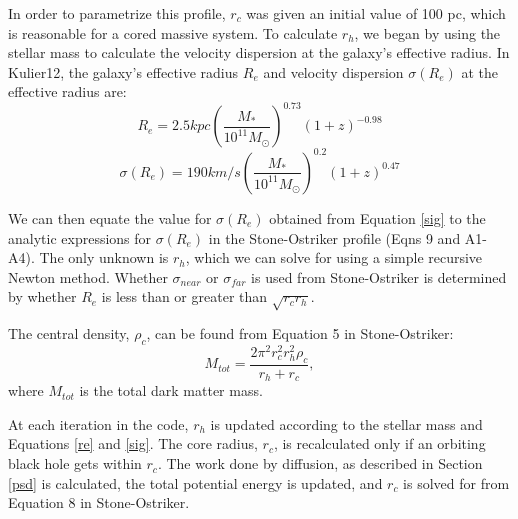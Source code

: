 \documentclass[english, apj]{emulateapj}
\begin{document}
In order to parametrize this profile, $r_c$ was given an initial value of 100 pc, which is reasonable for a cored massive system.  To calculate $r_h$, we began by using the stellar mass to calculate the velocity dispersion at the galaxy's effective radius.  In Kulier12, the galaxy's effective radius $R_{e}$ and velocity dispersion $\sigma(R_e)$ at the effective radius are:
\begin{equation} \label{re}
R_{e} = 2.5 kpc\left(\frac{M_*}{10^{11}M_{\odot}}\right)^{0.73}(1+z)^{-0.98}
\end{equation}
\begin{equation} \label{sig}
\sigma(R_{e}) = 190km/s\left(\frac{M_{*}}{10^{11}M_{\odot}}\right)^{0.2}(1+z)^{0.47}
\end{equation}

We can then equate the value for $\sigma({R_e})$ obtained from Equation \ref{sig} to the analytic expressions for $\sigma(R_{e})$ in the Stone-Ostriker profile (Eqns 9 and A1-A4).  The only unknown is $r_h$, which we can solve for using a simple recursive Newton method.  Whether $\sigma_{near}$ or $\sigma_{far}$ is used from Stone-Ostriker is determined by whether $R_e$ is less than or greater than $\sqrt{r_c r_h}$.

The central density, $\rho_c$, can be found from Equation 5 in Stone-Ostriker:
\begin{equation} \label{rhoc}
M_{tot} = \frac{2\pi^2r_{c}^2r_{h}^2\rho_c}{r_h+r_c},
\end{equation}
where $M_{tot}$ is the total dark matter mass.

At each iteration in the code, $r_h$ is updated according to the stellar mass and Equations \ref{re} and \ref{sig}.  The core radius, $r_c$, is recalculated only if an orbiting black hole gets within $r_c$.  The work done by diffusion, as described in Section \ref{psd} is calculated, the total potential energy is updated, and $r_c$ is solved for from Equation 8 in Stone-Ostriker.
\end{document}
